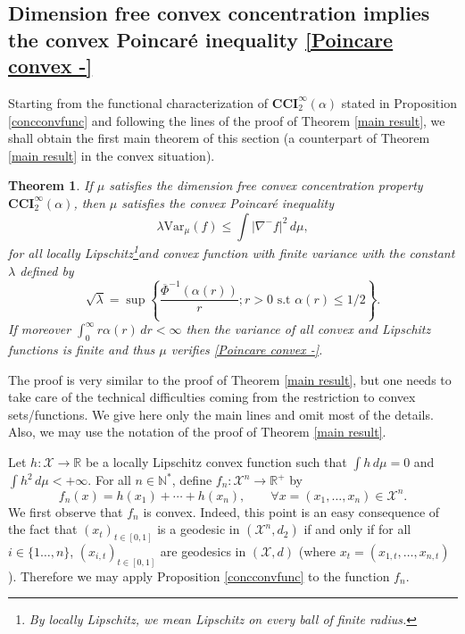 \documentclass[11pt]{amsart}
\newtheorem{thm}[equation]{Theorem}
\numberwithin{equation}{section}
\begin{document}
\subsection{Dimension free convex concentration implies the convex Poincar\'e inequality \ref{Poincare convex -}}Starting from the functional characterization of $\mathbf{CCI}_2^\infty(\alpha)$ stated in Proposition \ref{concconvfunc} and following the lines of the proof of Theorem \ref{main result}, we shall obtain the first main theorem of this section (a counterpart of Theorem \ref{main result} in the convex situation). 

\begin{thm}\label{main result convex} If $\mu$ satisfies the dimension free convex concentration property $\mathbf{CCI}_2^\infty(\alpha)$, then  $\mu$ satisfies the convex Poincar\'e inequality 
\[
\lambda\mathrm{Var}_\mu(f)\leq \int |\nabla^-f|^2\,d\mu,
\]
for all locally Lipschitz\footnote{By \emph{locally Lipschitz}, we mean Lipschitz on every ball of finite radius.}and convex function with finite variance with the constant $\lambda$ defined by
\[
\sqrt{\lambda}= \sup\left\{\frac{ \overline{\Phi}^{-1} \left(\alpha(r)\right)}{r}; r> 0 \text{ s.t } \alpha(r)\leq 1/2  \right\}.
\]
If moreover $\int_0^{\infty} r\alpha(r)\,dr<\infty$ then the variance of all convex and  Lipschitz functions is finite and thus $\mu$ verifies \eqref{Poincare convex -}.  
\end{thm}

\proof The proof is very similar to the proof of Theorem  \ref{main result}, but one needs to take care of the technical difficulties coming from the restriction to convex sets/functions. We give here only the main lines and omit most of the details.
Also, we may use the notation of the proof of Theorem  \ref{main result}.

Let $h:{\mathcal{X}} \to {\mathbb{R}}$ be a locally Lipschitz convex function such that $\int h\,d\mu=0$ and $\int h^2\,d\mu<+\infty$.
For all $n\in {\mathbb{N}}^*$, define $f_n:{\mathcal{X}}^n\to {\mathbb{R}}^+$ by 
\[
f_n(x)=h(x_1)+\cdots+h(x_n),\qquad \forall x=(x_1,\ldots,x_n)\in {\mathcal{X}}^n.
\]
We first observe that $f_n$ is convex. Indeed, this point is an easy  consequence of the fact that $(x_t)_{t\in [0,1]}$ is a geodesic in $({\mathcal{X}}^n,d_2)$  if and only if for all $i\in \{1\ldots,n\}$, $(x_{i,t})_{t\in [0,1]}$ are  geodesics in $({\mathcal{X}},d)$ (where $x_t=(x_{1,t},\ldots,x_{n,t})$). Therefore we may apply Proposition \ref{concconvfunc} to the function $f_n$. 
\end{document}
